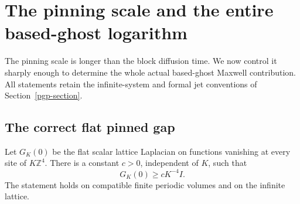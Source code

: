 \section{The pinning scale and the entire based-ghost logarithm}
\label{pgl-section}

The pinning scale is longer than the block diffusion
time. We now control it sharply enough to determine
the whole actual based-ghost Maxwell contribution.
All statements retain the infinite-system and formal
jet conventions of Section~\ref{pgp-section}.

\subsection{The correct flat pinned gap}
\label{pgl-gap-section}

\begin{lemma}
\label{pgl-gap}
Let \(G_K(0)\) be the flat scalar lattice Laplacian on
functions vanishing at every site of \(K\mathbb Z^4\).
There is a constant \(c>0\), independent of \(K\), such
that
\begin{equation}
                     G_K(0)\ge cK^{-4}I.
 \label{pgl-gap-bound}
\end{equation}
The statement holds on compatible finite periodic
volumes and on the infinite lattice.
\end{lemma}

